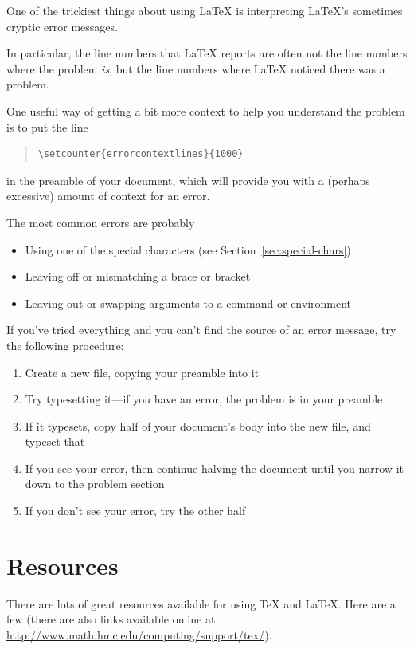 \documentclass{icmmcm}
\newcommand{\tex}{\TeX\xspace}
\newcommand{\latex}{\LaTeX\xspace}
\begin{document}
{One of the trickiest things about using \latex is interpreting
\latex's sometimes cryptic error messages.

In particular, the line numbers that \latex reports are often not the
line numbers where the problem \emph{is}, but the line numbers where
\latex noticed there was a problem.

One useful way of getting a bit more context to help you understand
the problem is to put the line
\begin{quote}
\begin{verbatim}
\setcounter{errorcontextlines}{1000}
\end{verbatim}
\end{quote}
in the preamble of your document, which will provide you with a
(perhaps excessive) amount of context for an error.

The most common errors are probably
\begin{itemize}
\item Using one of the special characters (see
Section~\ref{sec:special-chars})
\item Leaving off or mismatching a brace or bracket
\item Leaving out or swapping arguments to a command or environment
\end{itemize}

If you've tried everything and you can't find the source of an error
message, try the following procedure:
\begin{enumerate}
\item Create a new file, copying your preamble into it
\item Try typesetting it---if you have an error, the problem is in
  your preamble
\item If it typesets, copy half of your document's body into the new
  file, and typeset that
\item If you see your error, then continue halving the document until
  you narrow it down to the problem section
\item If you don't see your error, try the other half
\end{enumerate}



\section{Resources}

There are lots of great resources available for using \tex and \latex.
Here are a few (there are also links available online at
\url{http://www.math.hmc.edu/computing/support/tex/}).


}
\end{document}
